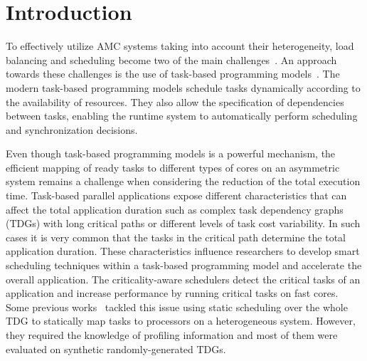 
\section{Introduction}
\label{sec.scheduling.intro}

To effectively utilize AMC systems taking into account their heterogeneity, load balancing and scheduling become two of the main challenges~\cite{Li4}.
An approach towards these challenges is the use of task-based programming models~\cite{OmpSs_PPL11,OpenMP,StarSs,starpu}.
The modern task-based programming models schedule tasks dynamically according to the availability of resources. They also allow the specification of dependencies between tasks, enabling the runtime system to automatically perform scheduling and synchronization decisions.

Even though task-based programming models is a powerful mechanism, the efficient mapping of ready tasks to different types of cores on an asymmetric system remains a challenge when considering the reduction of the total execution time. 
Task-based parallel applications expose different characteristics that can affect the total application duration such as complex task dependency graphs (TDGs) with long critical paths or different levels of task cost variability.
In such cases it is very common that the tasks in the critical path determine the total application duration. 
These characteristics influence researchers to develop smart scheduling techniques within a task-based programming model and accelerate the overall application.
The criticality-aware schedulers detect the critical tasks of an application and increase performance by running critical tasks on fast cores. 
Some previous works~\cite{DCPS, LDCP, HEFT, CrPathDup} tackled this issue using static scheduling over the whole TDG to statically map tasks to processors on a heterogeneous system. 
However, they required the knowledge of profiling information and most of them were evaluated on synthetic randomly-generated TDGs. 

